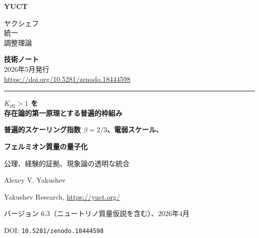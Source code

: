 \documentclass[12pt,a4paper]{article}
\newcommand{\makeheader}{%
	\noindent
	\begin{minipage}{0.17\textwidth}
		\raggedright
		{\sffamily\bfseries\color{skyblue}\fontsize{46}{46}\selectfont YUCT}%
	\end{minipage}%
	\hspace{30pt}
	\begin{minipage}{0.32\textwidth}
		\raggedright
		{\sffamily\fontsize{11}{13}\selectfont ヤクシェフ\\ 統一\\ 調整理論}%
	\end{minipage}%
	\hfill
	\begin{minipage}{0.38\textwidth}
		\raggedleft
		{\sffamily\bfseries 技術ノート}\\ 
		{\sffamily 2026年5月発行}\\ 
		{\sffamily\footnotesize \scriptsize\url{https://doi.org/10.5281/zenodo.18444598}}%
	\end{minipage}
	\par\vspace{5pt}
	\noindent\textcolor{gold}{\rule{\textwidth}{1.6pt}}
	\par\vspace{0pt}
}
\begin{document}
	\makeheader
	
		\centering
		\vspace*{1cm}
		
		{\Huge\bfseries \(K_{\mathrm{eff}} > 1\) を\\
			存在論的第一原理とする普遍的枠組み\par}
		\vspace{0.3cm}
		{\Large\bfseries 普遍的スケーリング指数 \(\beta = 2/3\)、電弱スケール、\par}
		\vspace{0.1cm}
		{\Large\bfseries フェルミオン質量の量子化\par}
		\vspace{0.5cm}
		{\large 公理、経験的証拠、現象論の透明な統合\par}
		
		\vspace{1cm}
		
		{\large Alexey V. Yakushev\par}
		\vspace{0.3cm}
		{\normalsize Yakushev Research, \url{https://yuct.org/}\par}
		
		\vspace{1.0cm}
		
		{\normalsize バージョン 6.3（ニュートリノ質量仮説を含む）、2026年4月\par}
		\vspace{0.3cm}
		{\normalsize DOI: \texttt{10.5281/zenodo.18444598}\par}
		
		\vfill
		
		\begin{abstract}
			\noindent
			本論文では、ヤクシェフ統一調整理論（YUCT）の最終的な論理構造を提示する。すべての主張は\textbf{公理}（還元不能な要請）、\textbf{定理}（公理から証明）、\textbf{経験則}（頑健に観測）、あるいは\textbf{現象論的適合}（制約はあるが未導出）に分類される。協調効率 \(K_{\mathrm{eff}} > 1\) の定義と三つの構造公理から、辞書の冗長因子が \(q = 2/3\) であることを証明する。普遍的指数 \(\beta = 2/3\) は、原子、生物、地球物理、宇宙論的スケールにわたる十数件の独立実験によって確認された\textbf{経験則}である。\(\beta = 2/3\) から代数的定数 \(S_{\mathrm{odd}} = 1.2\) と \(S_{\mathrm{even}} = 0.8\)（閉じた代数環）を導く。ワイルフェルミオンの自由度の数（\(96\)）を用いて、電弱スケール（\(m_W \approx 80.4\) GeV）を単一因子 \(\xi_W\) を除いて得る。同じ代数的構造がスケーリング量子 \(q = (3/2)^{1/3}\) を与える。9つの荷電フェルミオンの質量は半整数のラダー上にあり、精度は \(1\%\) より良い（特定の量子数 \(N_f\) は現在フィッティング）。このラダーの離散的構造は\textbf{反証可能な予言}である：許容集合 \(\{m_e q^{N/2}\}\) にない質量を持つ将来の粒子は理論を反証する。最も軽いニュートリノに対して許容される質量は \(\{0.0234, 0.0268, 0.0307, 0.0352, \dots\}\) eV である。理論は調整可能な連続パラメータを含まず、他にもいくつかの具体的で検証可能な予言を行う。
			
			さらに、フェルミオンセクターの総協調力を最大化することによって特定のニュートリノ量子数 \(N_{\nu} = -125\)（質量 \(\approx 0.023\) eV）を選択する変分仮説を提案する。この予言は反証可能であり、確認されれば理論を強化する。
		\end{abstract}
		
\end{document}
